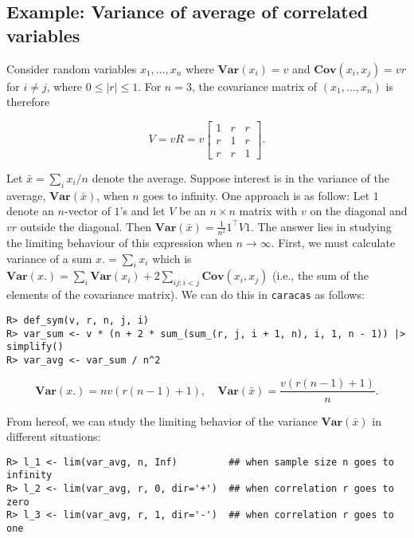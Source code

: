 \hypertarget{example-variance-of-average-of-correlated-variables}{%
\subsection{Example: Variance of average of correlated variables}\label{example-variance-of-average-of-correlated-variables}}

Consider random
variables \(x_1,\dots, x_n\) where \(\mathbf{Var}(x_i)=v\) and \(\mathbf{Cov}(x_i, x_j)=v r\) for \(i\not = j\), where \(0 \le |r| \le1\).
For \(n=3\), the covariance matrix of \((x_1,\dots, x_n)\) is therefore

\begin{equation}
  \label{eq:1}
  V = v R = v \left[\begin{matrix}1 & r & r\\r & 1 & r\\r & r & 1\end{matrix}\right]. 
\end{equation}

Let \(\bar x = \sum_i x_i / n\) denote the average. Suppose interest is
in the variance of the average, \(\mathbf{Var}(\bar x)\), when \(n\) goes to
infinity. One approach is as follow: Let \(1\) denote an \(n\)-vector of
\(1\)'s and let \(V\) be an \(n \times n\) matrix with \(v\) on the diagonal
and \(v r\) outside the diagonal. Then \(\mathbf{Var}(\bar x)=\frac 1 {n^2} 1^\top V 1\). The answer lies in studying the limiting behaviour of
this expression when \(n \rightarrow \infty\).
First, we must calculate variance of a sum \(x. = \sum_i x_i\)
which is \(\mathbf{Var}(x.) = \sum_i \mathbf{Var}(x_i) + 2 \sum_{ij:i<j} \mathbf{Cov}(x_i, x_j)\) (i.e., the sum of the elements of the covariance matrix).
We can do this in \texttt{caracas} as follows:

\begin{verbatim}
R> def_sym(v, r, n, j, i) 
R> var_sum <- v * (n + 2 * sum_(sum_(r, j, i + 1, n), i, 1, n - 1)) |> simplify()
R> var_avg <- var_sum / n^2
\end{verbatim}

\[
\mathbf{Var}(x.) = n v \left(r \left(n - 1\right) + 1\right),
\quad
\mathbf{Var}(\bar x) = \frac{v \left(r \left(n - 1\right) + 1\right)}{n}.
\]

From hereof, we can study the limiting behavior of the variance
\(\mathbf{Var}(\bar x)\) in different situations:

\begin{verbatim}
R> l_1 <- lim(var_avg, n, Inf)         ## when sample size n goes to infinity
R> l_2 <- lim(var_avg, r, 0, dir='+')  ## when correlation r goes to zero
R> l_3 <- lim(var_avg, r, 1, dir='-')  ## when correlation r goes to one
\end{verbatim}


